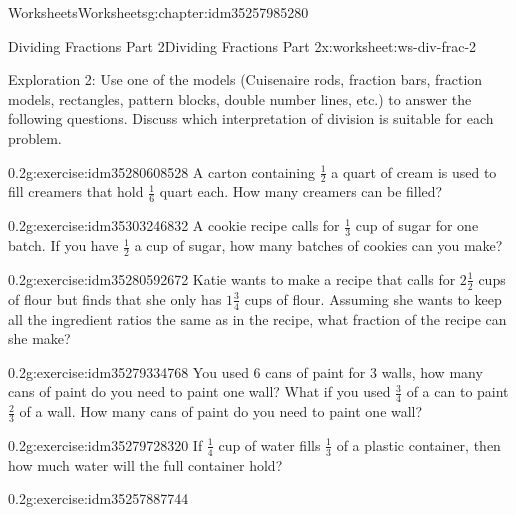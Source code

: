 \documentclass[twoside,11pt,]{book}
\begin{document}
\begin{chapterptx}{Worksheets}{}{Worksheets}{}{}{g:chapter:idm35257985280}
\restoregeometry
%
%
\typeout{************************************************}
\typeout{************************************************}
%
\begin{worksheet-section-numberless}{Dividing Fractions Part 2}{}{Dividing Fractions Part 2}{}{}{x:worksheet:ws-div-frac-2}
\begin{introduction}{}%
Exploration 2: Use one of the models (Cuisenaire rods, fraction bars, fraction models, rectangles, pattern blocks, double number lines, etc.) to answer the following questions. Discuss which interpretation of division is suitable for each problem.%
\end{introduction}%
\begin{divisionexercise}{1}{}{0.2}{g:exercise:idm35280608528}%
A carton containing \(\frac{1}{2} \)  a quart of cream is used to fill creamers that hold \(\frac{1}{6} \)  quart each.  How many creamers can be filled?%
\end{divisionexercise}%
\begin{divisionexercise}{2}{}{0.2}{g:exercise:idm35303246832}%
A cookie recipe calls for \(\frac{1}{3} \) cup of sugar for one batch.  If you have \(\frac{1}{2} \) a cup of sugar, how many batches of cookies can you make?%
\end{divisionexercise}%
\begin{divisionexercise}{3}{}{0.2}{g:exercise:idm35280592672}%
Katie wants to make a recipe that calls for \(2 \frac{1}{2} \) cups of flour but finds that she only has \(1 \frac{3}{4} \) cups of flour. Assuming she wants to keep all the ingredient ratios the same as in the recipe, what fraction of the recipe can she make?%
\end{divisionexercise}%
\clearpage
\begin{divisionexercise}{4}{}{0.2}{g:exercise:idm35279334768}%
You used 6 cans of paint for 3 walls, how many cans of paint do you need to paint one wall?  What if you used \(\frac{3}{4} \) of a can to paint \(\frac{2}{3} \) of a wall. How many cans of paint do you need to paint one wall?%
\end{divisionexercise}%
\begin{divisionexercise}{5}{}{0.2}{g:exercise:idm35279728320}%
If \(\frac{1}{4} \)  cup of water fills \(\frac{1}{3} \)  of a plastic container, then how much water will the full container hold?%
\end{divisionexercise}%
\begin{divisionexercise}{6}{}{0.2}{g:exercise:idm35257887744}%

\end{divisionexercise}
\end{worksheet-section-numberless}
\end{chapterptx}
\end{document}
